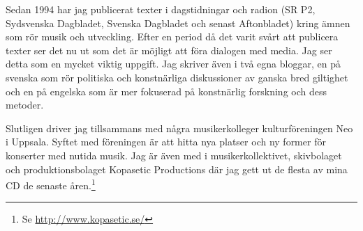 \documentclass[a4paper]{article}
\begin{document}
Sedan 1994 har jag publicerat texter i dagstidningar och radion (SR P2, Sydsvenska Dagbladet, Svenska Dagbladet och senast Aftonbladet) kring ämnen som rör musik och utveckling. Efter en period då det varit svårt att publicera texter ser det nu ut som det är möjligt att föra dialogen med media. Jag ser detta som en mycket viktig uppgift. Jag skriver även i två egna bloggar, en på svenska som rör politiska och konstnärliga diskussioner av ganska bred giltighet och en på engelska som är mer fokuserad på konstnärlig forskning och dess metoder.

Slutligen driver jag tillsammans med några musikerkolleger kulturföreningen Neo i Uppsala. Syftet med föreningen är att hitta nya platser och ny former för konserter med nutida musik. Jag är även med i musikerkollektivet, skivbolaget och produktionsbolaget Kopasetic Productions där jag gett ut de flesta av mina CD de senaste åren.\footnote{Se \url{http://www.kopasetic.se/}}

\newpage



% 
% 
\end{document}
